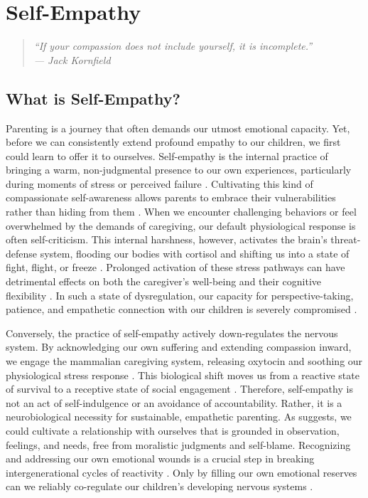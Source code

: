 ﻿\chapter{Self-Empathy}

\begin{quote}
\itshape ``If your compassion does not include yourself, it is incomplete.''\\
\upshape --- Jack Kornfield
\end{quote}

\section{What is Self-Empathy?}

Parenting is a journey that often demands our utmost emotional capacity.
Yet, before we can consistently extend profound empathy to our children, we first could learn to offer it to ourselves.
Self-empathy is the internal practice of bringing a warm, non-judgmental presence to our own experiences, particularly during moments of stress or perceived failure \citep{neff2003}.
Cultivating this kind of compassionate self-awareness allows parents to embrace their vulnerabilities rather than hiding from them \citep{brown2012}.
When we encounter challenging behaviors or feel overwhelmed by the demands of caregiving, our default physiological response is often self-criticism.
This internal harshness, however, activates the brain's threat-defense system, flooding our bodies with cortisol and shifting us into a state of fight, flight, or freeze \citep{porges2011}.
Prolonged activation of these stress pathways can have detrimental effects on both the caregiver's well-being and their cognitive flexibility \citep{lupien2009}.
In such a state of dysregulation, our capacity for perspective-taking, patience, and empathetic connection with our children is severely compromised \citep{siegel2011}.

Conversely, the practice of self-empathy actively down-regulates the nervous system.
By acknowledging our own suffering and extending compassion inward, we engage the mammalian caregiving system, releasing oxytocin and soothing our physiological stress response \citep{neff2003}.
This biological shift moves us from a reactive state of survival to a receptive state of social engagement \citep{porges2011}.
Therefore, self-empathy is not an act of self-indulgence or an avoidance of accountability.
Rather, it is a neurobiological necessity for sustainable, empathetic parenting.
As \citet{rosenberg2003} suggests, we could cultivate a relationship with ourselves that is grounded in observation, feelings, and needs, free from moralistic judgments and self-blame.
Recognizing and addressing our own emotional wounds is a crucial step in breaking intergenerational cycles of reactivity \citep{vanderkolk2014}.
Only by filling our own emotional reserves can we reliably co-regulate our children's developing nervous systems \citep{schore2001}.

